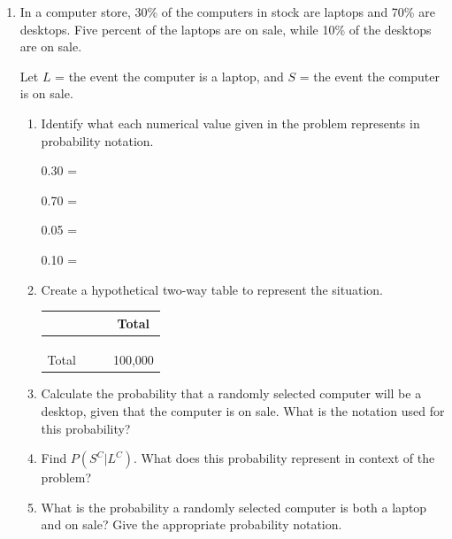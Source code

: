 \documentclass[
]{report}
\begin{document}
\begin{enumerate}
\def\labelenumi{\arabic{enumi}.}
\setcounter{enumi}{2}
\item
  In a computer store, 30\% of the computers in stock are laptops and 70\% are desktops. Five percent of the laptops are on sale, while 10\% of the desktops are on sale.
  \vspace{1mm}

  Let \(L\) = the event the computer is a laptop, and \(S\) = the event the computer is on sale.
  \vspace{0.1in}

  \begin{enumerate}
  \def\labelenumii{\alph{enumii}.}
  \item
    Identify what each numerical value given in the problem represents in probability notation.
    \vspace{.1in}

    0.30 =\\
    \vspace{.1in}

    0.70 =\\
    \vspace{.1in}

    0.05 =\\
    \vspace{.1in}

    0.10 =\\
    \vspace{.1in}
  \item
    Create a hypothetical two-way table to represent the situation.\\

    \renewcommand{\arraystretch}{1.5}
    \begin{center}
    \begin{tabular}{cccc} \hline
    \hspace{1in} & \hspace{1in} & \hspace{1in} & Total \\ \hline
    & & & \\ 
    & & & \\ 
    & & & \\ \hline
    Total & & & 100,000 \\ \hline
    \end{tabular}
    \end{center}
    \vspace{.1in}
  \item
    Calculate the probability that a randomly selected computer will be a desktop, given that the computer is on sale. What is the notation used for this probability?
    \vspace{.8in}
  \item
    Find \(P(S^C | L^C)\). What does this probability represent in context of the problem?
    \vspace{1in}
  \item
    What is the probability a randomly selected computer is both a laptop and on sale? Give the appropriate probability notation.
  \end{enumerate}
\end{enumerate}
\end{document}
